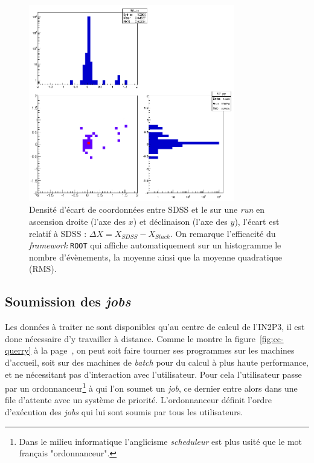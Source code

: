 	\begin{figure}[h]
		\centering
		\includegraphics[width=0.8\textwidth]{img/histroot.png}
		\caption[Densité d'écart de coordonnées]{Densité d'écart de coordonnées entre SDSS et le \stack{} sur une \emph{run} en ascension droite (l'axe des $x$) et déclinaison (l'axe des $y$), l'écart est relatif à SDSS : $\Delta X = X_{SDSS} - X_{Stack}$. On remarque l'efficacité du \emph{framework} \texttt{ROOT} qui affiche automatiquement sur un histogramme le nombre d'évènements, la moyenne ainsi que la moyenne quadratique (RMS).}
		\label{fig:histroot}
	\end{figure}


	\subsection{Soumission des \emph{jobs}}
	\label{ssec:soumission-jobs}

Les données à traiter ne sont disponibles qu'au centre de calcul de l'IN2P3, il est donc nécessaire d'y travailler à distance. Comme le montre la figure~\ref{fig:cc-querry} à la page~\pageref{fig:cc-querry}, on peut soit faire tourner ses programmes sur les machines d'accueil, soit sur des machines de \emph{batch} pour du calcul à plus haute performance, et ne nécessitant pas d'interaction avec l'utilisateur. Pour cela l'utilisateur passe par un ordonnanceur\footnote{Dans le milieu informatique l'anglicisme \emph{scheduleur} est plus usité que le mot français "ordonnanceur".} à qui l'on soumet un \emph{job}, ce dernier entre alors dans une file d'attente avec un système de priorité. L'ordonnanceur définit l'ordre d'exécution des \emph{jobs} qui lui sont soumis par tous les utilisateurs.

